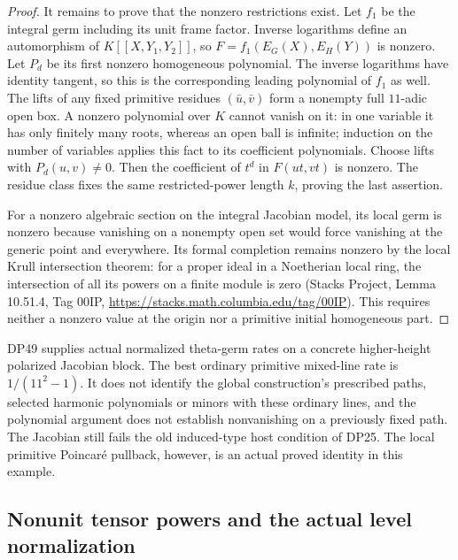 \documentclass[11pt,a4paper]{article}
\theoremstyle{definition}\newtheorem{remark}[theorem]{Remark}
\begin{document}
\begin{proof}
It remains to prove that the nonzero restrictions exist.
Let $f_1$ be the integral germ including its unit frame factor.
Inverse logarithms define an automorphism of $K[[X,Y_1,Y_2]]$, so
$F=f_1(E_G(X),E_H(Y))$ is nonzero.
Let $P_d$ be its first nonzero homogeneous polynomial.
The inverse logarithms have identity tangent, so this is the corresponding leading polynomial of $f_1$ as well.
The lifts of any fixed primitive residues $(\bar u,\bar v)$ form a nonempty full $11$-adic open box.
A nonzero polynomial over $K$ cannot vanish on it:
in one variable it has only finitely many roots, whereas an open ball is infinite; induction on the number of variables applies this fact to its coefficient polynomials.
Choose lifts with $P_d(u,v)\ne0$.
Then the coefficient of $t^d$ in $F(ut,vt)$ is nonzero.
The residue class fixes the same restricted-power length $k$, proving the last assertion.

For a nonzero algebraic section on the integral Jacobian model, its local germ is nonzero because vanishing on a nonempty open set would force vanishing at the generic point and everywhere.
Its formal completion remains nonzero by the local Krull intersection theorem: for a proper ideal in a Noetherian local ring, the intersection of all its powers on a finite module is zero
(Stacks Project, Lemma 10.51.4, Tag 00IP,
\url{https://stacks.math.columbia.edu/tag/00IP}).
This requires neither a nonzero value at the origin nor a primitive initial homogeneous part.
\end{proof}

DP49 supplies actual normalized theta-germ rates on a concrete higher-height polarized Jacobian block.
The best ordinary primitive mixed-line rate is $1/(11^2-1)$.
It does not identify the global construction's prescribed paths, selected harmonic polynomials or minors with these ordinary lines, and the polynomial argument does not establish nonvanishing on a previously fixed path.
The Jacobian still fails the old induced-type host condition of DP25.
The local primitive Poincar\'e pullback, however, is an actual proved identity in this example.


\subsection{Nonunit tensor powers and the actual level normalization}
\end{document}
